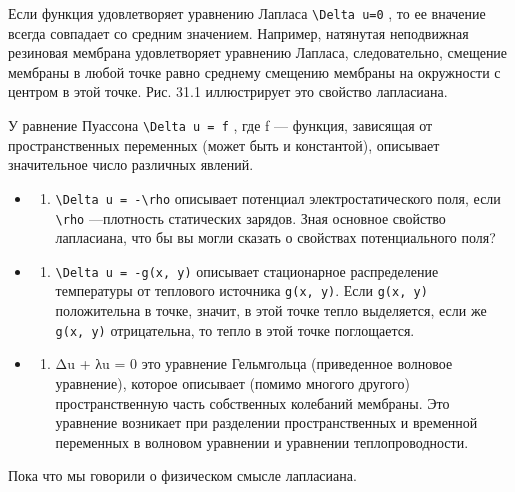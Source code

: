 \documentclass[
  ukrainian,
]{article}
\providecommand{\tightlist}{%
  \setlength{\itemsep}{0pt}\setlength{\parskip}{0pt}}
\begin{document}
Если функция удовлетворяет уравнению Лапласа
\texttt{\textbackslash{}Delta\ u=0} , то ее вначение всегда совпадает со
средним значением. Например, натянутая неподвижная резиновая мембрана
удовлетворяет уравнению Лапласа, следовательно, смещение мембраны в
любой точке равно среднему смещению мембраны на окружности с центром в
этой точке. Рис. 31.1 иллюстрирует это свойство лапласиана.

У равнение Пуассона \texttt{\textbackslash{}Delta\ u\ =\ f} , где f ---
функция, зависящая от пространственных переменных (может быть и
константой), описывает значительное число различных явлений.

\begin{itemize}
\tightlist
\item
  \begin{enumerate}
  \def\labelenumi{\arabic{enumi}.}
  \tightlist
  \item
    \texttt{\textbackslash{}Delta\ u\ =\ -\textbackslash{}rho} описывает
    потенциал электростатического поля, если
    \texttt{\textbackslash{}rho} ---плотность статических зарядов. Зная
    основное свойство лапласиана, что бы вы могли сказать о свойствах
    потенциального поля?
  \end{enumerate}
\item
  \begin{enumerate}
  \def\labelenumi{\arabic{enumi}.}
  \setcounter{enumi}{1}
  \tightlist
  \item
    \texttt{\textbackslash{}Delta\ u\ =\ -g(x,\ y)} описывает
    стационарное распределение температуры от теплового источника
    \texttt{g(x,\ y)}. Если \texttt{g(x,\ y)} положительна в точке,
    значит, в этой точке тепло выделяется, если же \texttt{g(x,\ y)}
    отрицательна, то тепло в этой точке поглощается.
  \end{enumerate}
\item
  \begin{enumerate}
  \def\labelenumi{\arabic{enumi}.}
  \setcounter{enumi}{2}
  \tightlist
  \item
    Δu + λu = 0 это уравнение Гельмгольца (приведенное волновое
    уравнение), которое описывает (помимо многого другого)
    пространственную часть собственных колебаний мембраны. Это уравнение
    возникает при разделении пространственных и временной переменных в
    волновом уравнении и уравнении теплопроводности.
  \end{enumerate}
\end{itemize}

Пока что мы говорили о физическом смысле лапласиана.
\end{document}
